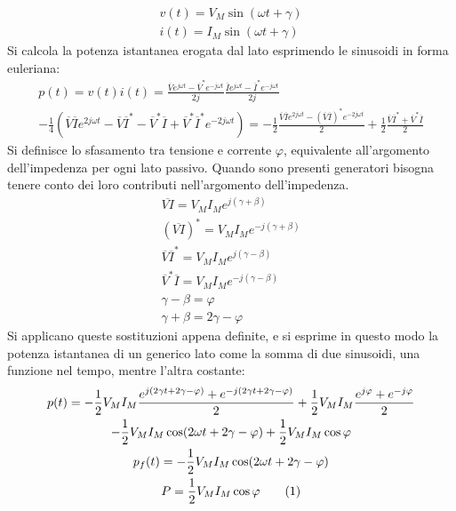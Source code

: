 \documentclass{article}
\newcommand{\tageq}{\tag{\stepcounter{equation}\theequation}}
\numberwithin{equation}{subsection}
\begin{document}
\begin{gather*}
    v(t)=V_M\sin(\omega t+\gamma)\\
    i(t)=I_M\sin(\omega t+\gamma)
\end{gather*}
Si calcola la potenza istantanea erogata dal lato esprimendo le sinusoidi in forma euleriana:
\begin{gather*}
    p(t)=v(t)i(t)=\displaystyle\frac{\overline{V}e^{j\omega t}-\overline{V}^*e^{-j\omega t}}{2j}\frac{\overline{I}e^{j\omega t}-\overline{I}^*e^{-j\omega t}}{2j}\\
    \displaystyle-\frac{1}{4}\left(\overline{V}\overline{I}e^{2j\omega t}-\overline{V}\overline{I}^*-\overline{V}^*\overline{I}+\overline{V}^*\overline{I}^*e^{-2j\omega t}\right)
    =-\frac{1}{2}\frac{\overline{V}\overline{I}e^{2j\omega t}-(\overline{V}\overline{I})^*e^{-2j\omega t}}{2}+\frac{1}{2}\frac{\overline{V}\overline{I}^*+\overline{V}^*\overline{I}}{2}
\end{gather*}
Si definisce lo sfasamento tra tensione e corrente $\varphi$, equivalente all'argomento dell'impedenza per ogni lato passivo. Quando sono presenti 
generatori bisogna tenere conto dei loro contributi nell'argomento dell'impedenza. 
\begin{gather*}
    \overline{VI}=V_MI_Me^{j(\gamma+\beta)}\\
     (\overline{VI})^*=V_MI_Me^{-j(\gamma+\beta)}\\
    \overline{V}\overline{I}^*=V_MI_Me^{j(\gamma-\beta)}\\
    \overline{V}^*\overline{I}=V_MI_Me^{-j(\gamma-\beta)}\\
    \gamma-\beta=\varphi\\
    \gamma+\beta=2\gamma-\varphi
\end{gather*}
Si applicano queste sostituzioni appena definite, e si esprime in questo modo la potenza istantanea di un generico lato come la somma di due sinusoidi, una funzione nel tempo, 
mentre l'altra costante:
\begin{gather*}
    p(t)=\displaystyle-\frac{1}{2}V_MI_M\frac{e^{j(2\gamma t+2\gamma-\varphi)}+e^{-j(2\gamma t+2\gamma-\varphi)}}{2}+\frac{1}{2}V_MI_M\frac{e^{j\varphi}+e^{-j\varphi}}{2}\\
    -\displaystyle\frac{1}{2}V_MI_M\cos(2\omega t+2\gamma-\varphi)+\frac{1}{2}V_MI_M\cos\varphi\\
    p_f(t)=-\displaystyle\frac{1}{2}V_MI_M\cos(2\omega t+2\gamma-\varphi)\\
    P=\displaystyle\frac{1}{2}V_MI_M\cos\varphi\tageq
\end{gather*}
\end{document}
